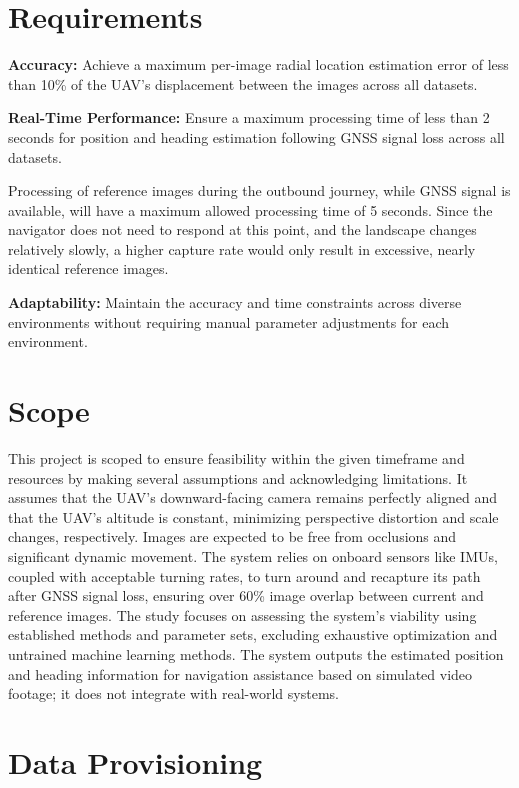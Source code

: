 \section{Requirements}
\label{sec:requirements}

\textbf{Accuracy:} Achieve a maximum per-image radial location estimation error of less than 10\% of the UAV's displacement between the images across all datasets.

\textbf{Real-Time Performance:} Ensure a maximum processing time of less than 2 seconds for position and heading estimation following GNSS signal loss across all datasets.

Processing of reference images during the outbound journey, while GNSS signal is available, will have a maximum allowed processing time of 5 seconds. Since the navigator does not need to respond at this point, and the landscape changes relatively slowly, a higher capture rate would only result in excessive, nearly identical reference images.


\textbf{Adaptability:} Maintain the accuracy and time constraints across diverse environments without requiring manual parameter adjustments for each environment. 

\section{Scope}
\label{sec:scope}
This project is scoped to ensure feasibility within the given timeframe and resources by making several assumptions and acknowledging limitations. It assumes that the UAV's downward-facing camera remains perfectly aligned and that the UAV's altitude is constant, minimizing perspective distortion and scale changes, respectively. Images are expected to be free from occlusions and significant dynamic movement. The system relies on onboard sensors like IMUs, coupled with acceptable turning rates, to turn around and recapture its path after GNSS signal loss, ensuring over 60\% image overlap between current and reference images. The study focuses on assessing the system's viability using established methods and parameter sets, excluding exhaustive optimization and untrained machine learning methods. The system outputs the estimated position and heading information for navigation assistance based on simulated video footage; it does not integrate with real-world systems.


\section{Data Provisioning}

